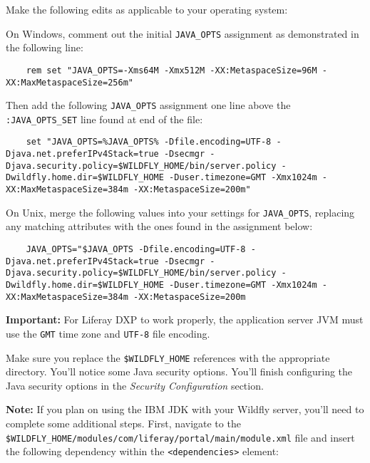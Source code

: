 Make the following edits as applicable to your operating system:

On Windows, comment out the initial \texttt{JAVA\_OPTS} assignment as
demonstrated in the following line:

\begin{verbatim}
    rem set "JAVA_OPTS=-Xms64M -Xmx512M -XX:MetaspaceSize=96M -XX:MaxMetaspaceSize=256m"
\end{verbatim}

Then add the following \texttt{JAVA\_OPTS} assignment one line above the
\texttt{:JAVA\_OPTS\_SET} line found at end of the file:

\begin{verbatim}
    set "JAVA_OPTS=%JAVA_OPTS% -Dfile.encoding=UTF-8 -Djava.net.preferIPv4Stack=true -Dsecmgr -Djava.security.policy=$WILDFLY_HOME/bin/server.policy -Dwildfly.home.dir=$WILDFLY_HOME -Duser.timezone=GMT -Xmx1024m -XX:MaxMetaspaceSize=384m -XX:MetaspaceSize=200m"
\end{verbatim}

On Unix, merge the following values into your settings for
\texttt{JAVA\_OPTS}, replacing any matching attributes with the ones
found in the assignment below:

\begin{verbatim}
    JAVA_OPTS="$JAVA_OPTS -Dfile.encoding=UTF-8 -Djava.net.preferIPv4Stack=true -Dsecmgr -Djava.security.policy=$WILDFLY_HOME/bin/server.policy -Dwildfly.home.dir=$WILDFLY_HOME -Duser.timezone=GMT -Xmx1024m -XX:MaxMetaspaceSize=384m -XX:MetaspaceSize=200m
\end{verbatim}

\noindent\hrulefill

\textbf{Important:} For Liferay DXP to work properly, the application
server JVM must use the \texttt{GMT} time zone and \texttt{UTF-8} file
encoding.

\noindent\hrulefill

Make sure you replace the \texttt{\$WILDFLY\_HOME} references with the
appropriate directory. You'll notice some Java security options. You'll
finish configuring the Java security options in the \emph{Security
Configuration} section.

\noindent\hrulefill

\textbf{Note:} If you plan on using the IBM JDK with your Wildfly
server, you'll need to complete some additional steps. First, navigate
to the
\texttt{\$WILDFLY\_HOME/modules/com/liferay/portal/main/module.xml} file
and insert the following dependency within the
\texttt{\textless{}dependencies\textgreater{}} element:

